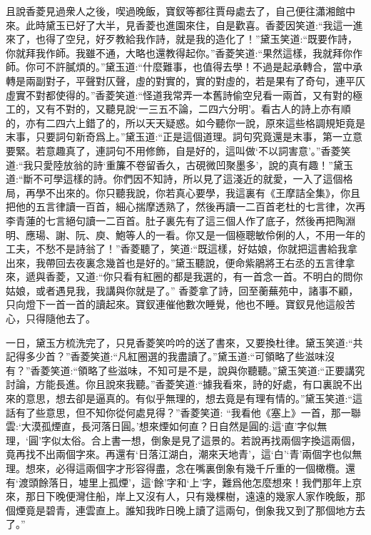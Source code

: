 \begin{parag}
    且說香菱見過衆人之後，喫過晚飯，寶釵等都往賈母處去了，自己便往瀟湘館中來。此時黛玉已好了大半，見香菱也進園來住，自是歡喜。香菱因笑道:“我這一進來了，也得了空兒，好歹教給我作詩，就是我的造化了！”黛玉笑道:“既要作詩，你就拜我作師。我雖不通，大略也還教得起你。”香菱笑道:“果然這樣，我就拜你作師。你可不許膩煩的。”黛玉道:“什麼難事，也值得去學！不過是起承轉合，當中承轉是兩副對子，平聲對仄聲，虛的對實的，實的對虛的，若是果有了奇句，連平仄虛實不對都使得的。”香菱笑道:“怪道我常弄一本舊詩偷空兒看一兩首，又有對的極工的，又有不對的，又聽見說‘一三五不論，二四六分明’。看古人的詩上亦有順的，亦有二四六上錯了的，所以天天疑惑。如今聽你一說，原來這些格調規矩竟是末事，只要詞句新奇爲上。”黛玉道:“正是這個道理。詞句究竟還是末事，第一立意要緊。若意趣真了，連詞句不用修飾，自是好的，這叫做‘不以詞害意’。”香菱笑道:“我只愛陸放翁的詩‘重簾不卷留香久，古硯微凹聚墨多’，說的真有趣！”黛玉道:“斷不可學這樣的詩。你們因不知詩，所以見了這淺近的就愛，一入了這個格局，再學不出來的。你只聽我說，你若真心要學，我這裏有《王摩詰全集》，你且把他的五言律讀一百首，細心揣摩透熟了，然後再讀一二百首老杜的七言律，次再李青蓮的七言絕句讀一二百首。肚子裏先有了這三個人作了底子，然後再把陶淵明、應瑒、謝、阮、庾、鮑等人的一看。你又是一個極聰敏伶俐的人，不用一年的工夫，不愁不是詩翁了！”香菱聽了，笑道:“既這樣，好姑娘，你就把這書給我拿出來，我帶回去夜裏念幾首也是好的。”黛玉聽說，便命紫鵑將王右丞的五言律拿來，遞與香菱，又道:“你只看有紅圈的都是我選的，有一首念一首。不明白的問你姑娘，或者遇見我，我講與你就是了。” 香菱拿了詩，回至蘅蕪苑中，諸事不顧，只向燈下一首一首的讀起來。寶釵連催他數次睡覺，他也不睡。寶釵見他這般苦心，只得隨他去了。
\end{parag}


\begin{parag}
    一日，黛玉方梳洗完了，只見香菱笑吟吟的送了書來，又要換杜律。黛玉笑道:“共記得多少首？”香菱笑道:“凡紅圈選的我盡讀了。”黛玉道:“可領略了些滋味沒有？”香菱笑道:“領略了些滋味，不知可是不是，說與你聽聽。”黛玉笑道:“正要講究討論，方能長進。你且說來我聽。”香菱笑道:“據我看來，詩的好處，有口裏說不出來的意思，想去卻是逼真的。有似乎無理的，想去竟是有理有情的。”黛玉笑道:“這話有了些意思，但不知你從何處見得？”香菱笑道: “我看他《塞上》一首，那一聯雲:‘大漠孤煙直，長河落日圓。’想來煙如何直？日自然是圓的:這‘直’字似無理，‘圓’字似太俗。合上書一想，倒象是見了這景的。若說再找兩個字換這兩個，竟再找不出兩個字來。再還有‘日落江湖白，潮來天地青’，這‘白’‘青’兩個字也似無理。想來，必得這兩個字才形容得盡，念在嘴裏倒象有幾千斤重的一個橄欖。還有‘渡頭餘落日，墟里上孤煙’，這‘餘’字和‘上’字，難爲他怎麼想來！我們那年上京來，那日下晚便灣住船，岸上又沒有人，只有幾棵樹，遠遠的幾家人家作晚飯，那個煙竟是碧青，連雲直上。誰知我昨日晚上讀了這兩句，倒象我又到了那個地方去了。”
\end{parag}


